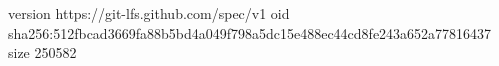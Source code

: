 version https://git-lfs.github.com/spec/v1
oid sha256:512fbcad3669fa88b5bd4a049f798a5dc15e488ec44cd8fe243a652a77816437
size 250582
